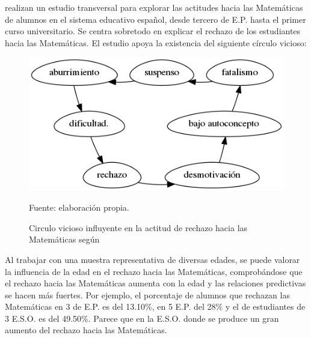 
\citet*{ActitudesHaciaMates} realizan un estudio transversal para explorar las actitudes hacia las Matemáticas de alumnos en el sistema educativo español, desde tercero de E.P. hasta el primer curso universitario. 
%
Se centra sobretodo en explicar el rechazo de los estudiantes hacia las Matemáticas.
%
El estudio apoya la existencia del siguiente círculo vicioso: 



\begin{figure}[hbt]
\centering
\caption{Circulo vicioso influyente en la actitud de rechazo hacia las Matemáticas según \citep{ActitudesHaciaMates}}
\label{fig::circuloVicioso}
\includegraphics[scale=0.57]{img/circuloVicioso.png}

\small{Fuente: elaboración propia.}
\end{figure}
\FloatBarrier




Al trabajar con una muestra representativa de diversas edades, se puede valorar la influencia de la edad en el rechazo hacia las Matemáticas, comprobándose que el rechazo hacia las Matemáticas aumenta con la edad y las relaciones predictivas se hacen más fuertes.
%
Por ejemplo, el porcentaje de alumnos que rechazan las Matemáticas en 3 de E.P. es del 13.10\%, en 5 E.P. del 28\%  y el de estudiantes de 3 E.S.O. es del 49.50\%.
%
Parece que en la E.S.O. donde se produce un gran aumento del rechazo hacia las Matemáticas.


